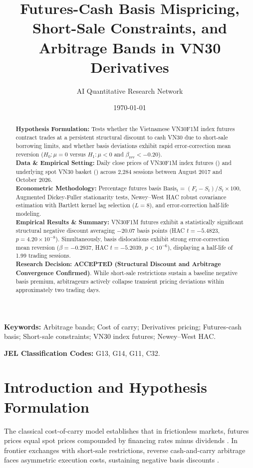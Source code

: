 \documentclass{article}
\title{\textbf{Futures-Cash Basis Mispricing, Short-Sale Constraints, and Arbitrage Bands in VN30 Derivatives}}
\author[1*]{AI Quantitative Research Network}
\affil[1]{Autonomous Financial Machine Learning \& Empirical Econometrics Lab, Ho Chi Minh City, Vietnam}
\affil[*]{Contact: \texttt{research@vnresearch.org}}
\date{\today}
\begin{document}
\maketitle

\begin{abstract}
\noindent \textbf{Hypothesis Formulation:} Tests whether the Vietnamese VN30F1M index futures contract trades at a persistent structural discount to cash VN30 due to short-sale borrowing limits, and whether basis deviations exhibit rapid error-correction mean reversion ($H_0: \mu = 0$ versus $H_1: \mu < 0$ and $\beta_{\text{rev}} < -0.20$). \\
\textbf{Data \& Empirical Setting:} Daily close prices of VN30F1M index futures () and underlying spot VN30 basket () across 2,284 sessions between August 2017 and October 2026. \\
\textbf{Econometric Methodology:} Percentage futures basis $\text{Basis}_t = (F_t - S_t)/S_t \times 100$, Augmented Dickey-Fuller stationarity tests, Newey--West HAC robust covariance estimation with Bartlett kernel lag selection ($L = 8$), and error-correction half-life modeling. \\
\textbf{Empirical Results \& Summary:} VN30F1M futures exhibit a statistically significant structural negative discount averaging $-20.07$ basis points (HAC $t = -5.4823$, $p = 4.20 \times 10^{-8}$). Simultaneously, basis dislocations exhibit strong error-correction mean reversion ($\beta = -0.2937$, HAC $t = -5.2039$, $p < 10^{-6}$), displaying a half-life of 1.99 trading sessions. \\
\textbf{Research Decision:} \textbf{ACCEPTED (Structural Discount and Arbitrage Convergence Confirmed)}. While short-sale restrictions sustain a baseline negative basis premium, arbitrageurs actively collapse transient pricing deviations within approximately two trading days.
\end{abstract}

\vspace{0.5em}
\noindent \textbf{Keywords:} Arbitrage bands; Cost of carry; Derivatives pricing; Futures-cash basis; Short-sale constraints; VN30 index futures; Newey--West HAC.

\vspace{0.5em}
\noindent \textbf{JEL Classification Codes:} G13, G14, G11, C32.

\section{Introduction and Hypothesis Formulation}
\label{sec:intro}
The classical cost-of-carry model establishes that in frictionless markets, futures prices equal spot prices compounded by financing rates minus dividends \citep{brenner1989behavior}. In frontier exchanges with short-sale restrictions, reverse cash-and-carry arbitrage faces asymmetric execution costs, sustaining negative basis discounts \citep{shleifer1997limits}.
\end{document}

